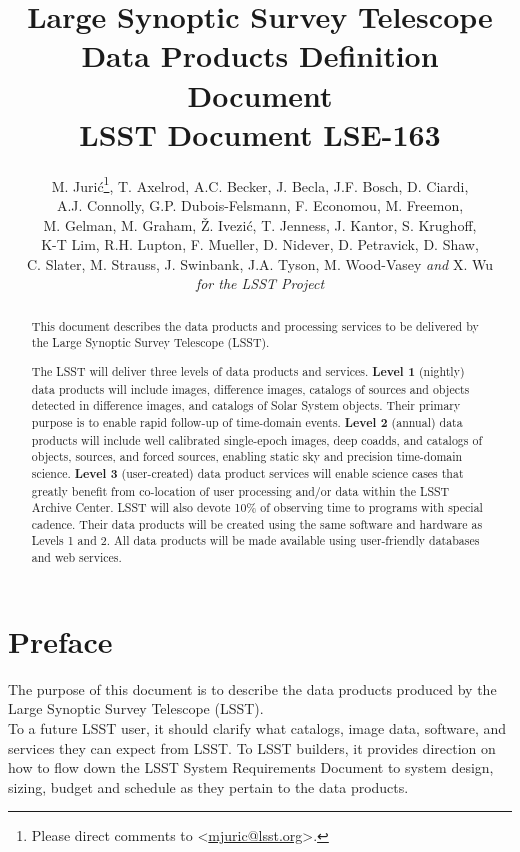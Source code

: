 \documentclass[12pt]{article}
\title{\vskip -1in Large Synoptic Survey Telescope \\
Data Products Definition Document \\
{\small \bf LSST Document LSE-163}}
\author{
{\small M. Juri\'c}\footnote{Please direct comments to \textless\href{mailto:mjuric@lsst.org}{mjuric@lsst.org}\textgreater.},
{\small T. Axelrod, A.C. Becker, J. Becla, J.F. Bosch, D. Ciardi, } \\
{\small A.J. Connolly,  G.P. Dubois-Felsmann, F. Economou, M. Freemon, } \\
{\small M. Gelman, M. Graham, \v{Z}. Ivezi\'c, T. Jenness,  J. Kantor, S. Krughoff, } \\
{\small K-T Lim,  R.H. Lupton, F. Mueller, D. Nidever, D. Petravick, D. Shaw, } \\
{\small C. Slater, M. Strauss, J. Swinbank, J.A. Tyson, M. Wood-Vasey {\em and} X. Wu} \vspace{1.2ex} \\
{\small {\em for the LSST Project}}
}
\begin{document}
\maketitle
\pagestyle{headings}

\begin{abstract}
This document describes the data products and processing services to be delivered by the Large Synoptic Survey Telescope (LSST).

The LSST will deliver three levels of data products and services. {\bf Level 1} (nightly) data products will include images, difference images, catalogs of sources and objects detected in difference images, and catalogs of Solar System objects. Their primary purpose is to enable rapid follow-up of time-domain events. {\bf Level 2} (annual) data products will include well calibrated single-epoch images, deep coadds, and catalogs of objects, sources, and forced sources, enabling static sky and precision time-domain science. {\bf Level 3} (user-created) data product services will enable science cases that greatly benefit from co-location of user processing and/or data within the LSST Archive Center. LSST will also devote 10\% of observing time to programs with special cadence. Their data products will be created using the same software and hardware as Levels 1 and 2. All data products will be made available using user-friendly databases and web services.

\end{abstract}

\clearpage

\tableofcontents

\clearpage

\section{Preface}

The purpose of this document is to describe the data products produced by the Large Synoptic Survey Telescope (LSST).
\\

To a future LSST user, it should clarify what catalogs, image data, software, and services they can expect from LSST. To LSST builders, it provides direction on how to flow down the LSST System Requirements Document to system design, sizing, budget and schedule as they pertain to the data products.
\\
\end{document}
